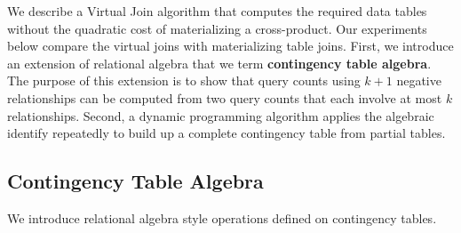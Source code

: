\documentclass{vldb}
\newcommand{\ct}{\mathit{ct}}
\begin{document}
We describe a Virtual Join algorithm that computes the required data tables without the quadratic cost of materializing a cross-product. Our experiments below compare the virtual joins with materializing table joins. 
First, we introduce an  extension of relational algebra that we term \textbf{contingency table algebra}. The purpose of this extension is to 
show that query counts using $k+1$ negative relationships can be computed from two query counts that each involve at most $k$ relationships. 
Second, a dynamic programming algorithm applies the algebraic identify repeatedly to build up a complete contingency table from partial tables.


\subsection{Contingency Table Algebra} \label{sec:cta}
We introduce relational algebra style operations defined on contingency tables.

\end{document}
